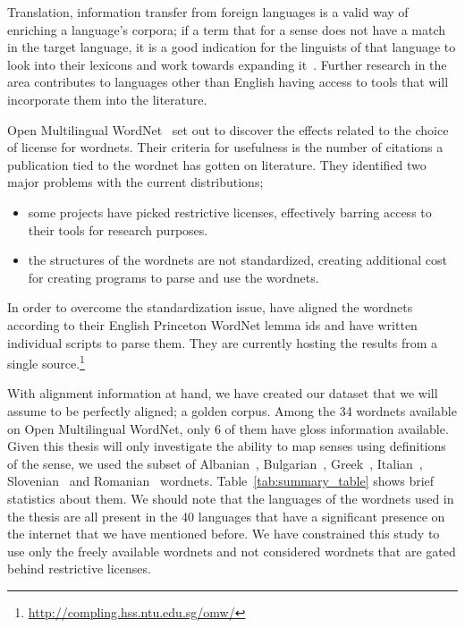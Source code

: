 Translation, information transfer from foreign languages is a valid way of enriching a language's corpora; if a term that for a sense does not have a match in the target language, it is a good indication for the linguists of that language to look into their lexicons and work towards expanding it~\cite{ibrahim_usta_turkce_2006}.
Further research in the area contributes to languages other than English having access to tools that will incorporate them into the literature.

Open Multilingual WordNet~\cite{bond_survey_2012} set out to discover the effects related to the choice of license for wordnets.
Their criteria for usefulness is the number of citations a publication tied to the wordnet has gotten on literature.
They identified two major problems with the current distributions;
\begin{itemize}
    \item some projects have picked restrictive licenses, effectively barring access to their tools for research purposes.
    \item the structures of the wordnets are not standardized, creating additional cost for creating programs to parse and use the wordnets.
\end{itemize}
In order to overcome the standardization issue, \citeauthor{bond_survey_2012} have aligned the wordnets according to their English Princeton WordNet lemma ids and have written individual scripts to parse them.
They are currently hosting the results from a single source.\footnote{\url{http://compling.hss.ntu.edu.sg/omw/}}

With alignment information at hand, we have created our dataset that we will assume to be perfectly aligned; a golden corpus.
Among the 34 wordnets available on Open Multilingual WordNet, only 6 of them have gloss information available.
Given this thesis will only investigate the ability to map senses using definitions of the sense, we used the subset of Albanian~\cite{ruci_current_2008}, Bulgarian~\cite{simov_constructing_2010}, Greek~\cite{stamou_exploring_2004}, Italian~\cite{pianta_multiwordnet_2002}, Slovenian~\cite{fiser_slownet_2012} and Romanian~\cite{tufis_romanian_2008} wordnets.
Table~\ref{tab:summary_table} shows brief statistics about them.
We should note that the languages of the wordnets used in the thesis are all present in the 40 languages that have a significant presence on the internet that we have mentioned before.
We have constrained this study to use only the freely available wordnets and not considered wordnets that are gated behind restrictive licenses.

